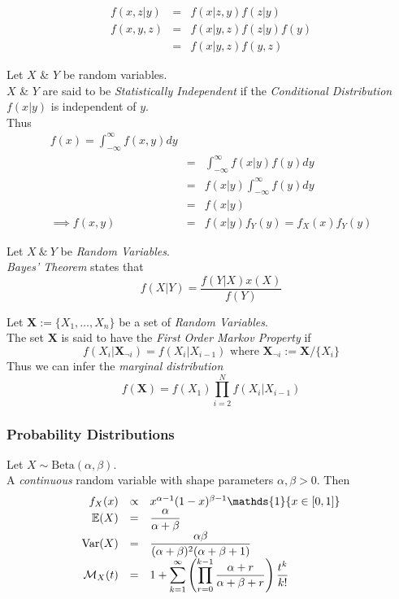 \documentclass[11pt,a4paper]{article}
\begin{document}
\[\begin{array}{rcl}
f(x,z|y)&=&f(x|z,y)f(z|y)\\
f(x,y,z)&=&f(x|y,z)f(z|y)f(y)\\
&=&f(x|y,z)f(y,z)
\end{array}\]

Let $X$ \& $Y$ be random variables.\\
$X$ \& $Y$ are said to be \textit{Statistically Independent} if the \textit{Conditional Distribution} $f(x|y)$ is independent of $y$.\\
Thus
\[\begin{array}{rcl}
f(x)=\displaystyle\int_{-\infty}^\infty f(x,y)dy\\
&=&\displaystyle\int_{-\infty}^\infty f(x|y)f(y)dy\\
&=&f(x|y)\displaystyle\int_{-\infty}^\infty f(y)dy\\
&=&f(x|y)\\
\implies f(x,y)&=&f(x|y)f_Y(y)=f_X(x)f_Y(y)
\end{array}\]

Let $X\ \&\ Y$ be \textit{Random Variables}.\\
\textit{Bayes' Theorem} states that
$$f(X|Y)=\dfrac{f(Y|X)x(X)}{f(Y)}$$

Let $\textbf{X}:=\{X_1,\dots,X_n\}$ be a set of \textit{Random Variables}.\\
The set $\textbf{X}$ is said to have the \textit{First Order Markov Property} if
$$f(X_i|\textbf{X}_{\neg i})= f(X_i|X_{i-1})\text{ where }\textbf{X}_{\neg i}:=\textbf{X}/\{X_i\}$$
Thus we can infer the \textit{marginal distribution}
$$f(\textbf{X})=f(X_1)\prod_{i=2}^Nf(X_i|X_{i-1})$$

\subsubsection{Probability Distributions}

Let $X\sim\text{Beta}(\alpha,\beta)$.\\
A \textit{continuous} random variable with shape parameters $\alpha,\beta>0$. Then
\[\begin{array}{rcl}
f_X(x)&\propto&x^{\alpha-1}(1-x)^{\beta-1}\mathds{1}\{x\in[0,1]\}\\
\expect(X)&=&\dfrac{\alpha}{\alpha+\beta}\\
\var(X)&=&\dfrac{\alpha\beta}{(\alpha+\beta)^2(\alpha+\beta+1)}\\
\mathcal{M}_X(t)&=&1+{\displaystyle\sum_{k=1}^\infty\left(\prod_{r=0}^{k-1}\dfrac{\alpha+r}{\alpha+\beta+r}\right)\dfrac{t^k}{k!}}
\end{array}\]
\end{document}
